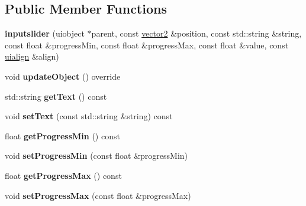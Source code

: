 \subsection*{Public Member Functions}
\begin{DoxyCompactItemize}
\item 
\mbox{\label{classflounder_1_1inputslider_acceb7f87ad9de910a40637462b717026}} 
{\bfseries inputslider} (uiobject $\ast$parent, const \hyperlink{classflounder_1_1vector2}{vector2} \&position, const std\+::string \&string, const float \&progress\+Min, const float \&progress\+Max, const float \&value, const \hyperlink{namespaceflounder_a70f1871d5c05aa8e078dd37501ce10a9}{uialign} \&align)
\item 
\mbox{\label{classflounder_1_1inputslider_aa4fab4980853dc11e84dc2fa30d32bd4}} 
void {\bfseries update\+Object} () override
\item 
\mbox{\label{classflounder_1_1inputslider_abb19ff9ca712ed80b5642294c0034f28}} 
std\+::string {\bfseries get\+Text} () const
\item 
\mbox{\label{classflounder_1_1inputslider_a1f572b09075257e08b5e27fd8af4aeb3}} 
void {\bfseries set\+Text} (const std\+::string \&string) const
\item 
\mbox{\label{classflounder_1_1inputslider_ad28da400c028c8ba35ead767ae192892}} 
float {\bfseries get\+Progress\+Min} () const
\item 
\mbox{\label{classflounder_1_1inputslider_af7d08c95f39e9943e4e4eaa9d6be87b9}} 
void {\bfseries set\+Progress\+Min} (const float \&progress\+Min)
\item 
\mbox{\label{classflounder_1_1inputslider_a48468b731d40bd79a9cf85aeb1e09be6}} 
float {\bfseries get\+Progress\+Max} () const
\item 
\mbox{\label{classflounder_1_1inputslider_a8f146d939081c56aad47715f906e2d32}} 
void {\bfseries set\+Progress\+Max} (const float \&progress\+Max)
\item 

\end{DoxyCompactItemize}
